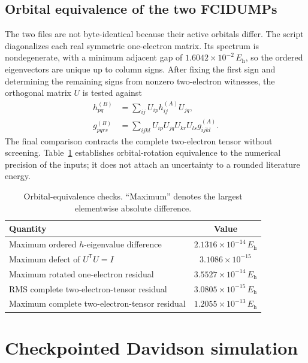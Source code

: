 \documentclass[aps,onecolumn,superscriptaddress,nofootinbib,longbibliography]{revtex4-2}
\newcommand{\Eh}{E_{\mathrm h}}
\begin{document}
\subsection{Orbital equivalence of the two FCIDUMPs}

The two files are not byte-identical because their active orbitals differ.
The script  diagonalizes
each real symmetric one-electron matrix.  Its spectrum is nondegenerate, with
a minimum adjacent gap of \(1.6042\times10^{-2}\,\Eh\), so the ordered
eigenvectors are unique up to column signs.  After fixing the first sign and
determining the remaining signs from nonzero two-electron witnesses, the
orthogonal matrix \(U\) is tested against
\begin{align}
 h^{(B)}_{pq}&=\sum_{ij}U_{ip}h^{(A)}_{ij}U_{jq},
 \label{eq:s-rotation-h}\\
 g^{(B)}_{pqrs}&=\sum_{ijkl}U_{ip}U_{jq}U_{kr}U_{ls}g^{(A)}_{ijkl}.
 \label{eq:s-rotation-g}
\end{align}
The final comparison contracts the complete two-electron tensor without
screening.  Table~\ref{tab:equivalence} establishes orbital-rotation
equivalence to the numerical precision of the inputs; it does not attach an
uncertainty to a rounded literature energy.

\begin{table}[h]
\caption{Orbital-equivalence checks.  ``Maximum'' denotes the largest
elementwise absolute difference.}
\label{tab:equivalence}
\begin{ruledtabular}
\begin{tabular}{lc}
Quantity & Value \\
\hline
Maximum ordered \(h\)-eigenvalue difference & \(2.1316\times10^{-14}\,\Eh\) \\
Maximum defect of \(U^{\mathsf T}U=I\) & \(3.1086\times10^{-15}\) \\
Maximum rotated one-electron residual & \(3.5527\times10^{-14}\,\Eh\) \\
RMS complete two-electron-tensor residual & \(3.0805\times10^{-15}\,\Eh\) \\
Maximum complete two-electron-tensor residual & \(1.2055\times10^{-13}\,\Eh\) \\
\end{tabular}
\end{ruledtabular}
\end{table}

\section{Checkpointed Davidson simulation}
\end{document}

